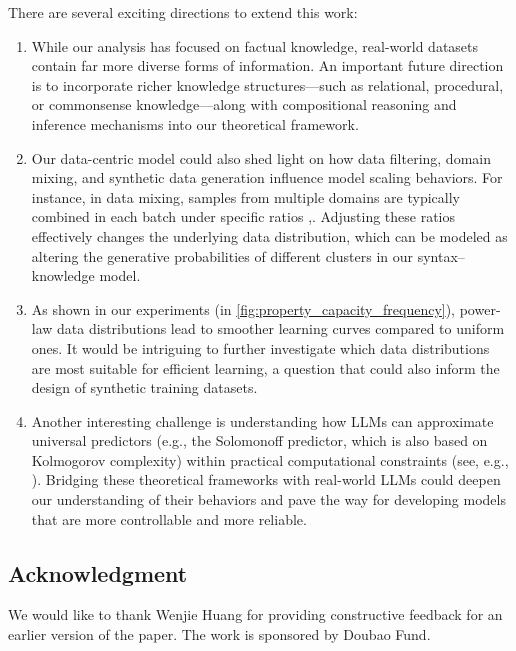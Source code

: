 \documentclass[11pt]{article}
\theoremstyle{plain}
\theoremstyle{definition}
\begin{document}
There are several exciting directions to extend this work:
\begin{enumerate}
\item
While our analysis has focused on factual knowledge, real-world datasets contain far more diverse forms of information. An important future direction is to incorporate richer knowledge structures—such as relational, procedural, or commonsense knowledge—along with compositional reasoning and inference mechanisms into our theoretical framework.

\item
Our data-centric model could also shed light on how data filtering, domain mixing, and synthetic data generation influence model scaling behaviors. For instance, in data mixing, samples from multiple domains are typically combined in each batch under specific ratios \citep{liuregmix,yedata,chenaioli},. Adjusting these ratios effectively changes the underlying data distribution, which can be modeled as altering the generative probabilities of different clusters in our syntax–knowledge model. 

\item
As shown in our experiments (in \cref{fig:property_capacity_frequency}), power-law data distributions lead to smoother learning curves compared to uniform ones. It would be intriguing to further investigate which data distributions are most suitable for efficient learning, a question that could also inform the design of synthetic training datasets.

\item
Another interesting challenge is understanding how LLMs can approximate universal predictors (e.g., the Solomonoff predictor, which is also based on Kolmogorov complexity) within practical computational constraints (see, e.g., \citep{graulearning,lee2022relaxing}). Bridging these theoretical frameworks with real-world LLMs could deepen our understanding of their behaviors and pave the way for developing models that are more controllable and more reliable.
\end{enumerate}


\begin{arxiv}

\section{Acknowledgment}

We would like to thank Wenjie Huang for providing constructive feedback for an earlier version of the paper. The work is sponsored by Doubao Fund.

    
\end{arxiv}
\end{document}
